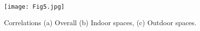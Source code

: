
\begin{figure}
\begin{center}
\texttt{[image: Fig5.jpg]}
\caption{Correlations (a) Overall (b) Indoor spaces, (c) Outdoor spaces.}
\label{fig:Clustering}
\end{center}
\end{figure}



